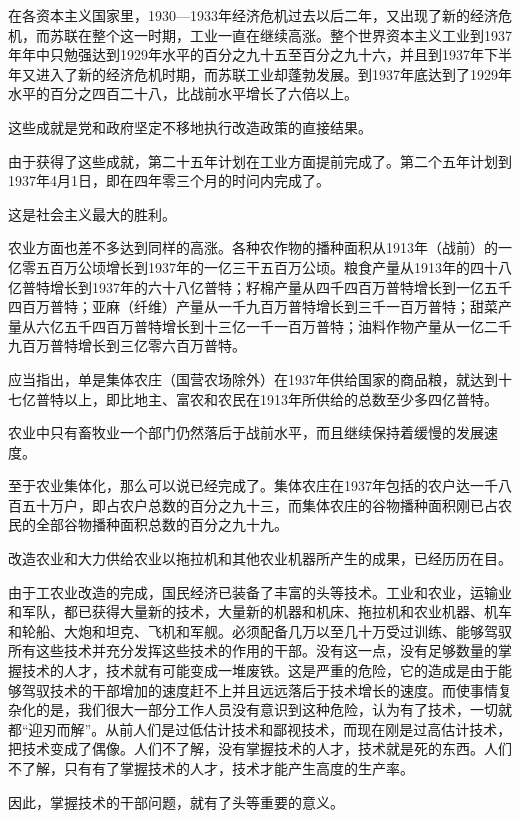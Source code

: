 在各资本主义国家里，1930—1933年经济危机过去以后二年，又出现了新的经济危机，而苏联在整个这一时期，工业一直在继续高涨。整个世界资本主义工业到1937年年中只勉强达到1929年水平的百分之九十五至百分之九十六，并且到1937年下半年又进入了新的经济危机时期，而苏联工业却蓬勃发展。到1937年底达到了1929年水平的百分之四百二十八，比战前水平增长了六倍以上。

这些成就是党和政府坚定不移地执行改造政策的直接结果。

由于获得了这些成就，第二十五年计划在工业方面提前完成了。第二个五年计划到1937年4月1日，即在四年零三个月的时问内完成了。

这是社会主义最大的胜利。

农业方面也差不多达到同样的高涨。各种农作物的播种面积从1913年（战前）的一亿零五百万公顷增长到1937年的一亿三干五百万公顷。粮食产量从1913年的四十八亿普特增长到1937年的六十八亿普特；籽棉产量从四千四百万普特增长到一亿五千四百万普特；亚麻（纤维）产量从一千九百万普特增长到三千一百万普特；甜菜产量从六亿五千四百万普特增长到十三亿一千一百万普特；油料作物产量从一亿二千九百万普特增长到三亿零六百万普特。

应当指出，单是集体农庄（国营农场除外）在1937年供给国家的商品粮，就达到十七亿普特以上，即比地主、富农和农民在1913年所供给的总数至少多四亿普特。

农业中只有畜牧业一个部门仍然落后于战前水平，而且继续保持着缓慢的发展速度。

至于农业集体化，那么可以说已经完成了。集体农庄在1937年包括的农户达一千八百五十万户，即占农户总数的百分之九十三，而集体农庄的谷物播种面积刚已占农民的全部谷物播种面积总数的百分之九十九。

改造农业和大力供给农业以拖拉机和其他农业机器所产生的成果，已经历历在目。

由于工农业改造的完成，国民经济已装备了丰富的头等技术。工业和农业，运输业和军队，都已获得大量新的技术，大量新的机器和机床、拖拉机和农业机器、机车和轮船、大炮和坦克、飞机和军舰。必须配备几万以至几十万受过训练、能够驾驭所有这些技术并充分发挥这些技术的作用的干部。没有这一点，没有足够数量的掌握技术的人才，技术就有可能变成一堆废铁。这是严重的危险，它的造成是由于能够驾驭技术的干部增加的速度赶不上并且远远落后于技术增长的速度。而使事情复杂化的是，我们很大一部分工作人员没有意识到这种危险，认为有了技术，一切就都“迎刃而解”。从前人们是过低估计技术和鄙视技术，而现在刚是过高估计技术，把技术变成了偶像。人们不了解，没有掌握技术的人才，技术就是死的东西。人们不了解，只有有了掌握技术的人才，技术才能产生高度的生产率。

因此，掌握技术的干部问题，就有了头等重要的意义。

